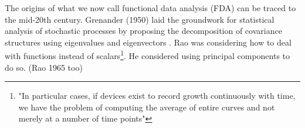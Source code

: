 The origins of what we now call functional data analysis (FDA) can be traced to the mid-20th century. Grenander (1950) laid the groundwork for statistical analysis of stochastic processes by proposing the decomposition of covariance structures using eigenvalues and eigenvectors \cite{ulf_grenander_stochastic_1950}.  
Rao was considering how to deal with functions instead of scalars\footnote{"In particular cases, if devices exist to record growth continuously with time, we have the problem of computing the average of entire curves and not merely at a number of time points"}.  
He considered using principal components to do so\cite{rao_statistical_1958}.  (Rao 1965 too)